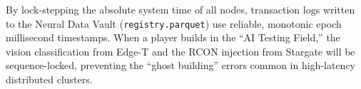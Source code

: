 By lock-stepping the absolute system time of all nodes, transaction logs written to the Neural Data Vault (\texttt{registry.parquet}) use reliable, monotonic epoch millisecond timestamps. When a player builds in the ``AI Testing Field,'' the vision classification from Edge-T and the RCON injection from Stargate will be sequence-locked, preventing the ``ghost building'' errors common in high-latency distributed clusters.